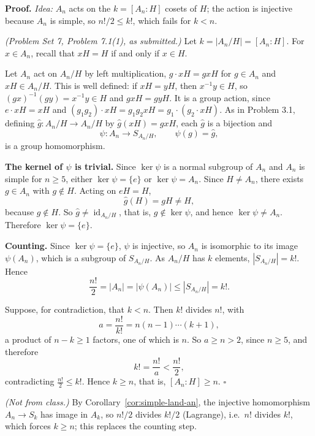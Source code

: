 \documentclass[11pt]{report}
\renewenvironment{proof}[1][Proof]{\noindent\textbf{#1.} }{\hfill$\square$\par\vspace{5pt}}
\begin{document}
\begin{proof}
\textit{Idea:} $A_n$ acts on the $k = [A_n : H]$ cosets of $H$; the action is injective because $A_n$ is simple, so $n!/2 \leq k!$, which fails for $k < n$.\par
\textit{(Problem Set 7, Problem 7.1(1), as submitted.)} Let $k = |A_n/H| = [A_n : H]$. For $x \in A_n$, recall that $xH = H$ if and only if $x \in H$.

Let $A_n$ act on $A_n/H$ by left multiplication, $g \cdot xH = gxH$ for $g \in A_n$ and $xH \in A_n/H$. This is well defined: if $xH = yH$, then $x^{-1}y \in H$, so $(gx)^{-1}(gy) = x^{-1}y \in H$ and $gxH = gyH$. It is a group action, since $e \cdot xH = xH$ and $(g_1g_2) \cdot xH = g_1g_2xH = g_1 \cdot (g_2 \cdot xH)$. As in Problem 3.1, defining $\hat g \colon A_n/H \to A_n/H$ by $\hat g(xH) = gxH$, each $\hat g$ is a bijection and
\[
\psi \colon A_n \to S_{A_n/H}, \qquad \psi(g) = \hat g,
\]
is a group homomorphism.

\textbf{The kernel of $\psi$ is trivial.} Since $\ker\psi$ is a normal subgroup of $A_n$ and $A_n$ is simple for $n \geq 5$, either $\ker\psi = \{e\}$ or $\ker\psi = A_n$. Since $H \neq A_n$, there exists $g \in A_n$ with $g \notin H$. Acting on $eH = H$,
\[
\hat g(H) = gH \neq H,
\]
because $g \notin H$. So $\hat g \neq \operatorname{id}_{A_n/H}$, that is, $g \notin \ker\psi$, and hence $\ker\psi \neq A_n$. Therefore $\ker\psi = \{e\}$.

\textbf{Counting.} Since $\ker\psi = \{e\}$, $\psi$ is injective, so $A_n$ is isomorphic to its image $\psi(A_n)$, which is a subgroup of $S_{A_n/H}$. As $A_n/H$ has $k$ elements, $|S_{A_n/H}| = k!$. Hence
\[
\frac{n!}{2} = |A_n| = |\psi(A_n)| \leq |S_{A_n/H}| = k!.
\]

Suppose, for contradiction, that $k < n$. Then $k!$ divides $n!$, with
\[
a = \frac{n!}{k!} = n(n-1)\cdots(k+1),
\]
a product of $n - k \geq 1$ factors, one of which is $n$. So $a \geq n > 2$, since $n \geq 5$, and therefore
\[
k! = \frac{n!}{a} < \frac{n!}{2},
\]
contradicting $\frac{n!}{2} \leq k!$. Hence $k \geq n$, that is, $[A_n : H] \geq n$.
\end{proof}

\begin{rembox}[{A Shortcut}]\label{rem:an-subgroup-index-shortcut}
\textit{(Not from class.)} By Corollary~\ref{cor:simple-land-an}, the injective homomorphism $A_n \to S_k$ has image in $A_k$, so $n!/2$ divides $k!/2$ (Lagrange), i.e.\ $n!$ divides $k!$, which forces $k \geq n$; this replaces the counting step.
\end{rembox}
\end{document}
